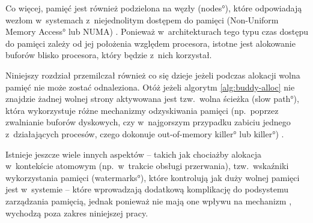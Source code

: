 Co więcej, pamięć jest również podzielona na węzły (\ang{nodes}),
które odpowiadają wezłom w~systemach z~niejednolitym dostępem do
pamięci (\ang{Non-Uniform Memory Access} lub NUMA)
\autocite[podrozdział 8.1.2]{bib:utlk}.  Ponieważ w~architekturach
tego typu czas dostępu do pamięci zależy od jej położenia względem
procesora, istotne jest alokowanie buforów blisko procesora, który
będzie z~nich korzystał.

Niniejszy rozdział przemilczał również co się dzieje jeżeli podczas
alokacji wolna pamięć nie może zostać odnaleziona.  Otóż jeżeli
algorytm \ref{alg:buddy-alloc} nie znajdzie żadnej wolnej strony
aktywowana jest tzw.\ wolna ścieżka (\ang{slow path}), która
wykorzystuje różne mechanizmy odzyskiwania pamięci (np.\ poprzez
zwalnianie buforów dyskowych, czy w~najgorszym przypadku zabiciu
jednego z~działających procesów, czego dokonuje \ang*{out-of-memory
  killer} lub  \ang*{killer}) \autocite[rozdział 17]{bib:utlk}.

Istnieje jeszcze wiele innych aspektów -- takich jak chociażby
alokacja w~kontekście atomowym (np.\ w~trakcie obsługi przerwania),
tzw.\ wskaźniki wykorzystania pamięci (\ang{watermarks}), które
kontrolują jak duży wolnej pamięci jest w~systemie -- które
wprowadzają dodatkową komplikację do podsystemu zarządzania pamięcią,
jednak ponieważ nie mają one wpływu na mechanizm , wychodzą
poza zakres niniejszej pracy.
